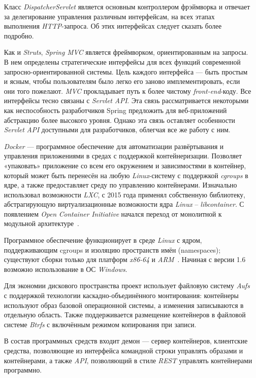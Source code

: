Класс \textit{DispatcherServlet} является основным контроллером фрэймворка и отвечает за делегирование управления различным интерфейсам, на всех этапах выполнения \textit{HTTP}-запроса. Об этих интерфейсах следует сказать более подробно.

Как и \textit{Struts}, \textit{Spring MVC} является фреймворком, ориентированным на запросы. В нем определены стратегические интерфейсы для всех функций современной запросно-ориентированной системы. Цель каждого интерфейса — быть простым и ясным, чтобы пользователям было легко его заново имплементировать, если они того пожелают. \textit{MVC} прокладывает путь к более чистому \textit{front-end}-коду. Все интерфейсы тесно связаны с \textit{Servlet API}. Эта связь рассматривается некоторыми как неспособность разработчиков Spring предложить для веб-приложений абстракцию более высокого уровня. Однако эта связь оставляет особенности \textit{Servlet API} доступными для разработчиков, облегчая все же работу с ним. 

\textit{Docker} — программное обеспечение для автоматизации развёртывания и управления приложениями в средах с поддержкой контейнеризации. Позволяет «упаковать» приложение со всем его окружением и зависимостями в контейнер, который может быть перенесён на любую \textit{Linux}-систему с поддержкой \textit{cgroups} в ядре, а также предоставляет среду по управлению контейнерами. Изначально использовал возможности \textit{LXC}, с 2015 года применял собственную библиотеку, абстрагирующую виртуализационные возможности ядра \textit{Linux} -- \textit{libcontainer}. С появлением \textit{​Open Container Initiative} начался переход от монолитной к модульной архитектуре~\cite{docker}.

Программное обеспечение функционирует в среде \textit{Linux} с ядром, поддерживающим cgroups и изоляцию пространств имён (namespaces); существуют сборки только для платформ \textit{x86-64} и \textit{ARM}~\cite{docker}. Начиная с версии 1.6 возможно использование в ОС \textit{Windows}.

Для экономии дискового пространства проект использует файловую систему \textit{Aufs} с поддержкой технологии каскадно-объединённого монтирования: контейнеры используют образ базовой операционной системы, а изменения записываются в отдельную область. Также поддерживается размещение контейнеров в файловой системе \textit{Btrfs} с включённым режимом копирования при записи.

В состав программных средств входит демон — сервер контейнеров, клиентские средства, позволяющие из интерфейса командной строки управлять образами и контейнерами, а также \textit{API}, позволяющий в стиле \textit{REST} управлять контейнерами программно.

